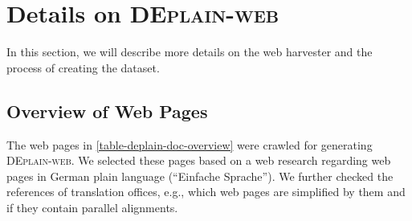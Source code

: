 \documentclass[11pt]{article}
\begin{document}
\section{Details on \textsc{DEplain-web}}
\label{sec-deplain-web-process}
In this section, we will describe more details on the web harvester and the process of creating the dataset. 

\subsection{Overview of Web Pages}
The web pages in \autoref{table-deplain-doc-overview} were crawled for generating \textsc{DEplain-web}. We selected these pages based on a web research regarding web pages in German plain language (``Einfache Sprache''). We further checked the references of translation offices, e.g., which web pages are simplified by them and if they contain parallel alignments. 
\end{document}
